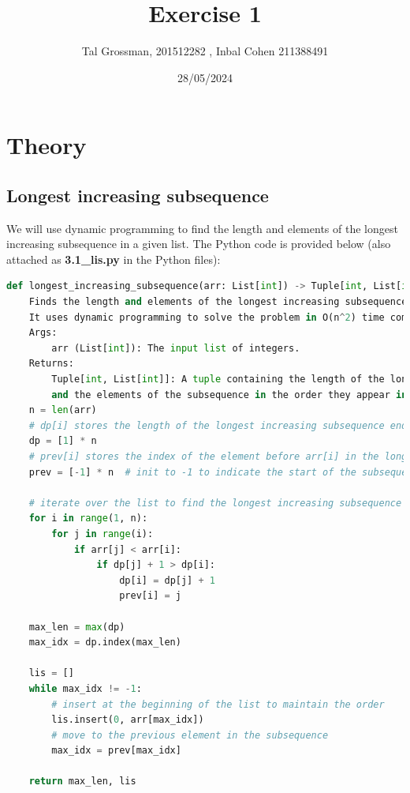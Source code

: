 \documentclass{assignmeownt}
\title{Exercise 1}
\author{Tal Grossman, 201512282 , Inbal Cohen 211388491}
\date{28/05/2024}
\begin{document}
\maketitle
\thispagestyle{firststyle}
\section{Theory}
\subsection{Longest increasing subsequence}
We will use dynamic programming to find the length and elements of the longest increasing subsequence in a given list. The Python code is provided below (also attached as \textbf{3.1\_lis.py} in the Python files):

\begin{lstlisting}[language=Python, basicstyle=\tiny, caption={Python code for finding the longest increasing subsequence}]
def longest_increasing_subsequence(arr: List[int]) -> Tuple[int, List[int]]:
    Finds the length and elements of the longest increasing subsequence in a given list.
    It uses dynamic programming to solve the problem in O(n^2) time complexity.
    Args:
        arr (List[int]): The input list of integers.
    Returns:
        Tuple[int, List[int]]: A tuple containing the length of the longest increasing subsequence
        and the elements of the subsequence in the order they appear in the original list.
    n = len(arr)
    # dp[i] stores the length of the longest increasing subsequence ending at index i
    dp = [1] * n
    # prev[i] stores the index of the element before arr[i] in the longest increasing subsequence
    prev = [-1] * n  # init to -1 to indicate the start of the subsequence

    # iterate over the list to find the longest increasing subsequence by
    for i in range(1, n):
        for j in range(i):
            if arr[j] < arr[i]:
                if dp[j] + 1 > dp[i]:
                    dp[i] = dp[j] + 1
                    prev[i] = j

    max_len = max(dp)
    max_idx = dp.index(max_len)

    lis = []
    while max_idx != -1:
        # insert at the beginning of the list to maintain the order
        lis.insert(0, arr[max_idx])
        # move to the previous element in the subsequence
        max_idx = prev[max_idx]

    return max_len, lis
\end{lstlisting}
\end{document}

